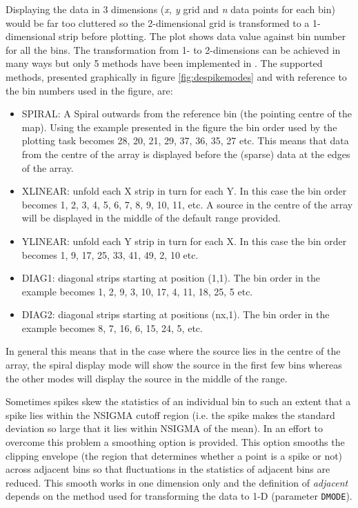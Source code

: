 \documentclass[twoside,11pt]{starlink}
\providecommand{\task}[1]{#1}
\providecommand{\param}[1]{\texttt{#1}}
\providecommand{\despike}{\htmlref{\task{despike}}{DESPIKE}}
\begin{document}
Displaying the data in 3 dimensions (\textit{x, y} grid and \textit{n} data points
for each bin) would be far too cluttered so the 2-dimensional grid is
transformed to a 1-dimensional strip before plotting. The plot shows data
value against bin  number for all the bins. The transformation from 1- to
2-dimensions can be achieved in many ways but only 5 methods have been
implemented in \despike.  The supported methods, presented graphically in
figure \ref{fig:despikemodes} and with reference to the bin numbers used in
the figure, are:


\begin{itemize}

\item SPIRAL: A Spiral
outwards from the reference bin (the pointing centre of the map). Using the example presented in the figure
the bin order used by the plotting task becomes 28, 20, 21, 29, 37, 36, 35,
27 etc. This means that data from the centre of the array is displayed before
the (sparse) data at the edges of the array.

        \item XLINEAR: unfold each X strip in turn for each Y. In this case
the bin order becomes 1, 2, 3, 4, 5, 6, 7, 8, 9, 10, 11, etc. A source in
the centre of the array will be displayed in the middle of the default range
provided.

        \item YLINEAR:  unfold each Y strip in turn for each X. In this case
the bin order becomes 1, 9, 17, 25, 33, 41, 49, 2, 10 etc.

        \item DIAG1:    diagonal strips starting at position (1,1). The bin
order in the example becomes 1, 2, 9, 3, 10, 17, 4, 11, 18, 25, 5 etc.

        \item DIAG2:   diagonal strips starting at positions (nx,1). The bin
order in the example becomes 8, 7, 16, 6, 15, 24, 5, etc.

\end{itemize}

In general this means that in the case where the source lies in the centre of
the array, the spiral display mode will show the source in the first
few bins whereas the other modes will display the source in the middle of
the range.

Sometimes spikes skew the statistics of an individual bin to such an extent
that a spike lies within the NSIGMA cutoff region (i.e. the spike makes the
standard deviation so large that it lies within NSIGMA of the mean). In an
effort to overcome this problem a smoothing option is provided.
This option smooths the clipping envelope (the region that determines whether
a point is a spike or not) across adjacent bins so that fluctuations in the
statistics of adjacent bins are reduced. This smooth works in one dimension
only and the definition of \textit{adjacent} depends on the method used for
transforming the data to 1-D (parameter \param{DMODE}).
\end{document}
